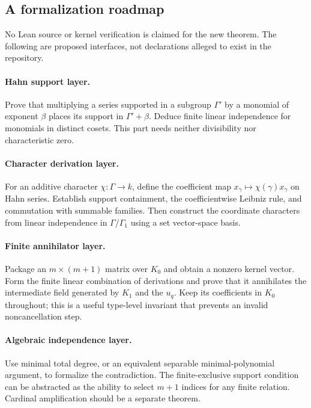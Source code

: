 \documentclass[11pt,letterpaper]{article}
\theoremstyle{definition}
\theoremstyle{remark}
\numberwithin{equation}{section}
\begin{document}
\subsection{A formalization roadmap}\label{isc:hj:sub:formal}

No Lean source or kernel verification is claimed for the new theorem.
The following are proposed interfaces, not declarations alleged to
exist in the repository.

\paragraph{Hahn support layer.}
Prove that multiplying a series supported in a subgroup $\Gamma'$ by a
monomial of exponent $\beta$ places its support in $\Gamma'+\beta$.
Deduce finite linear independence for monomials in distinct cosets.
This part needs neither divisibility nor characteristic zero.

\paragraph{Character derivation layer.}
For an additive character $\chi:\Gamma\to k$, define the coefficient
map $x_\gamma\mapsto\chi(\gamma)x_\gamma$ on Hahn series. Establish
support containment, the coefficientwise Leibniz rule, and commutation
with summable families. Then construct the coordinate characters from
linear independence in $\Gamma/\Gamma_1$ using a set vector-space basis.

\paragraph{Finite annihilator layer.}
Package an $m\times(m+1)$ matrix over $K_0$ and obtain a nonzero kernel
vector. Form the finite linear combination of derivations and prove that
it annihilates the intermediate field generated by $K_1$ and the $u_q$.
Keep its coefficients in $K_0$ throughout; this is a useful type-level
invariant that prevents an invalid noncancellation step.

\paragraph{Algebraic independence layer.}
Use minimal total degree, or an equivalent separable minimal-polynomial
argument, to formalize the contradiction. The finite-exclusive support
condition can be abstracted as the ability to select $m+1$ indices for
any finite relation. Cardinal amplification should be a separate theorem.
\end{document}
